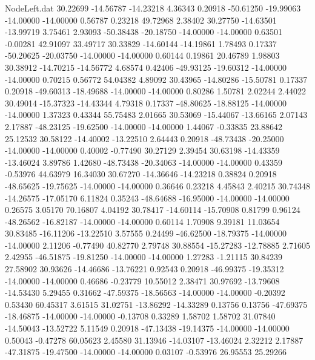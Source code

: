 \begin{filecontents}{NodeLeft.dat}
  30.22699  -14.56787  -14.23218     4.36343    0.20918  -50.61250  -19.99063  -14.00000  -14.00000    0.56787    0.23218   49.72968    2.38402
  30.27750  -14.63501  -13.99719     3.75461    2.93093  -50.38438  -20.18750  -14.00000  -14.00000    0.63501   -0.00281   42.91097   33.49717
  30.33829  -14.60144  -14.19861     1.78493    0.17337  -50.20625  -20.03750  -14.00000  -14.00000    0.60144    0.19861   20.46789    1.98803
  30.38912  -14.70215  -14.56772     4.68574    0.42406  -49.93125  -19.60312  -14.00000  -14.00000    0.70215    0.56772   54.04382    4.89092
  30.43965  -14.80286  -15.50781     0.17337    0.20918  -49.60313  -18.49688  -14.00000  -14.00000    0.80286    1.50781    2.02244    2.44022
  30.49014  -15.37323  -14.43344     4.79318    0.17337  -48.80625  -18.88125  -14.00000  -14.00000    1.37323    0.43344   55.75483    2.01665
  30.53069  -15.44067  -13.66165     2.07143    2.17887  -48.23125  -19.62500  -14.00000  -14.00000    1.44067   -0.33835   23.88642   25.12532
  30.58122  -14.40002  -13.22510     2.64443    0.20918  -48.73438  -20.25000  -14.00000  -14.00000    0.40002   -0.77490   30.27129    2.39454
  30.63198  -14.43359  -13.46024     3.89786    1.42680  -48.73438  -20.34063  -14.00000  -14.00000    0.43359   -0.53976   44.63979   16.34030
  30.67270  -14.36646  -14.23218     0.38824    0.20918  -48.65625  -19.75625  -14.00000  -14.00000    0.36646    0.23218    4.45843    2.40215
  30.74348  -14.26575  -17.05170     6.11824    0.35243  -48.64688  -16.95000  -14.00000  -14.00000    0.26575    3.05170   70.16807    4.04192
  30.78417  -14.60114  -15.70908     0.81799    0.96124  -48.26562  -16.82187  -14.00000  -14.00000    0.60114    1.70908    9.39181   11.03654
  30.83485  -16.11206  -13.22510     3.57555    0.24499  -46.62500  -18.79375  -14.00000  -14.00000    2.11206   -0.77490   40.82770    2.79748
  30.88554  -15.27283  -12.78885     2.71605    2.42955  -46.51875  -19.81250  -14.00000  -14.00000    1.27283   -1.21115   30.84239   27.58902
  30.93626  -14.46686  -13.76221     0.92543    0.20918  -46.99375  -19.35312  -14.00000  -14.00000    0.46686   -0.23779   10.55012    2.38471
  30.97692  -13.79608  -14.53430     5.29455    0.31662  -47.59375  -18.56563  -14.00000  -14.00000   -0.20392    0.53430   60.45317    3.61515
  31.02751  -13.86292  -14.33289     0.13756    0.13756  -47.69375  -18.46875  -14.00000  -14.00000   -0.13708    0.33289    1.58702    1.58702
  31.07840  -14.50043  -13.52722     5.11549    0.20918  -47.13438  -19.14375  -14.00000  -14.00000    0.50043   -0.47278   60.05623    2.45580
  31.13946  -14.03107  -13.46024     2.32212    2.17887  -47.31875  -19.47500  -14.00000  -14.00000    0.03107   -0.53976   26.95553   25.29266

\end{filecontents}
